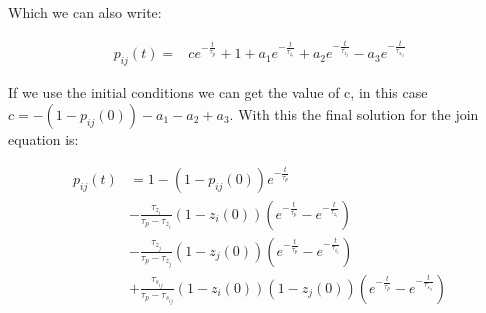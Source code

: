 \documentclass[10pt,a4paper]{article}
\begin{document}
Which we can also write:

\begin{align*}
p_{ij}(t) = & c e^{-\frac{t}{\tau_p}} + 1 +  a_1 e^{-\frac{t}{\tau_{z_i}}} + a_2 e^{-\frac{t}{\tau_{z_j}}} - a_3 e^{-\frac{t}{\tau_{s_{ij}}}} 
\end{align*}

If we use the initial conditions we can get the value of c, in this case $c = -(1 - p_{ij}(0)) - a_1 - a_2 + a_3$. With this the final solution for the join equation is:

\begin{align*}
p_{ij}(t) &= 1 - (1 - p_{ij}(0))e^{-\frac{t}{\tau_p}} \\ 
& - \frac{\tau_{z_i}}{\tau_p - \tau_{z_i}}(1 - z_i(0))( e^{-\frac{t}{\tau_p}} - e^{-\frac{t}{\tau_{z_i}}}) \\
& - \frac{\tau_{z_j}}{\tau_p - \tau_{z_j}}(1 - z_j(0)) (e^{-\frac{t}{\tau_p}} - e^{-\frac{t}{\tau_{z_j}}})  \\ 
& + \frac{\tau_{s_{ij}}}{\tau_p - \tau_{s_{ij}}} (1 - z_i(0))(1 - z_j(0))( e^{-\frac{t}{\tau_p}} - e^{-\frac{t}{\tau_{s_{ij}}}}) 
\end{align*}
\end{document}
